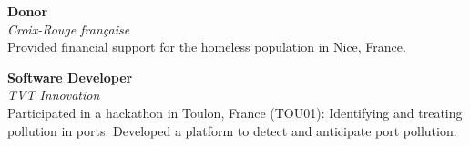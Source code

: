 \textbf{Donor}  \\
\textit{Croix-Rouge française} \\
\small
Provided financial support for the homeless population in Nice, France.
\vspace{1ex}

\textbf{Software Developer}  \\
\textit{TVT Innovation} \\
\small
Participated in a hackathon in Toulon, France (TOU01): Identifying and treating pollution in ports. Developed a platform to detect and anticipate port pollution.
